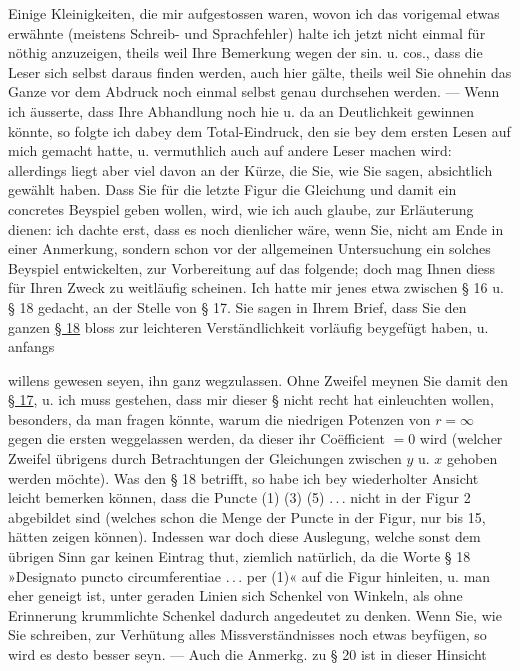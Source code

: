 Einige Kleinigkeiten, die mir aufgestossen waren, wovon ich das vorigemal etwas erwähnte
(meistens Schreib- und Sprachfehler) halte ich jetzt nicht einmal für nöthig anzuzeigen, theils
weil Ihre Bemerkung wegen der sin. u. cos., dass die Leser sich selbst daraus finden werden,
auch hier gälte, theils weil Sie ohnehin das Ganze vor dem Abdruck noch einmal selbst genau
durchsehen werden. — Wenn ich äusserte, dass Ihre Abhandlung noch hie u. da an Deutlichkeit
gewinnen könnte, so folgte ich dabey dem Total-Eindruck, den sie bey dem ersten Lesen auf mich
gemacht hatte, u. vermuthlich auch auf andere Leser machen wird: allerdings liegt aber viel
davon an der Kürze, die Sie, wie Sie sagen, absichtlich gewählt haben. Dass Sie für die letzte
Figur die Gleichung und damit ein concretes Beyspiel geben wollen, wird, wie ich auch glaube,
zur Erläuterung dienen: ich dachte erst, dass es noch dienlicher wäre, wenn Sie, nicht am Ende
in einer Anmerkung, sondern schon vor der allgemeinen Untersuchung ein solches Beyspiel
entwickelten, zur Vorbereitung auf das folgende; doch mag Ihnen diess für Ihren Zweck zu
weitläufig scheinen. Ich hatte mir jenes etwa zwischen § 16 u. § 18 gedacht, an der Stelle
von § 17. Sie sagen in Ihrem Brief, dass Sie den ganzen \underline{§ 18} bloss zur leichteren
Verständlichkeit vorläufig beygefügt haben, u. anfangs
\par\clearpage
{}
\noindent willens gewesen seyen, ihn ganz wegzulassen. Ohne Zweifel meynen Sie damit den
\underline{§ 17}, u. ich muss gestehen, dass mir dieser § nicht recht hat einleuchten wollen,
besonders, da man fragen könnte, warum die niedrigen Potenzen von $r=\infty$ gegen die ersten
weggelassen werden, da dieser ihr Coëfficient $=0$ wird (welcher Zweifel übrigens durch
Betrachtungen der Gleichungen zwischen $y$ u. $x$ gehoben werden möchte). Was den § 18 betrifft,
so habe ich bey wiederholter Ansicht leicht bemerken können, dass die Puncte (1) (3) (5)
.\,.\,. nicht in der Figur 2 abgebildet sind (welches schon die Menge der Puncte in der Figur,
nur bis 15, hätten zeigen können). Indessen war doch diese Auslegung, welche sonst dem übrigen
Sinn gar keinen Eintrag thut, ziemlich natürlich, da die Worte § 18 »Designato puncto
circumferentiae .\,.\,. per (1)« auf die Figur hinleiten, u. man eher geneigt ist, unter geraden
Linien sich Schenkel von Winkeln, als ohne Erinnerung krummlichte Schenkel dadurch angedeutet
zu denken. Wenn Sie, wie Sie schreiben, zur Verhütung alles Missverständnisses noch etwas
beyfügen, so wird es desto besser seyn. — Auch die Anmerkg. zu § 20 ist in dieser Hinsicht
